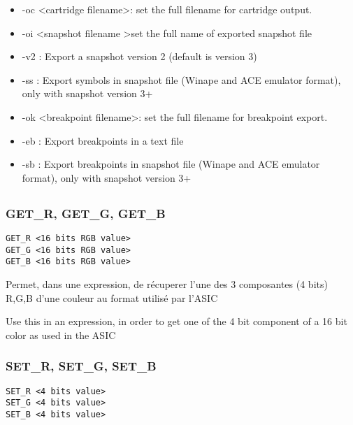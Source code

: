 \begin{xen}
\begin{itemize}
\item -oc \textless cartridge filename\textgreater  : set the full filename for cartridge output.
\item -oi \textless snapshot filename \textgreater set the full name of exported snapshot file
\item -v2 : Export a snapshot version 2 (default is version 3)
\item -ss : Export symbols in snapshot file (Winape and ACE emulator format), only with snapshot version 3+
\item -ok \textless breakpoint filename\textgreater :	set the full filename for breakpoint export.
\item -eb : Export breakpoints in a text file
\item -sb : Export breakpoints in snapshot file (Winape and ACE emulator format), only with snapshot version 3+
\end{itemize}
\end{xen}


\subsection{}

\subsubsection{GET\_R, GET\_G, GET\_B}

\begin{verbatim}
GET_R <16 bits RGB value>
GET_G <16 bits RGB value>
GET_B <16 bits RGB value>
\end{verbatim}

\begin{xfr}
Permet, dans une expression, de récuperer l'une des 3 composantes (4 bits) R,G,B d'une couleur au format utilisé par l'ASIC
\end{xfr}

\begin{xen}
Use this in an expression, in order to get one of the 4 bit component of a 16 bit color as used in the ASIC
\end{xen}

\subsubsection{SET\_R, SET\_G, SET\_B}
\begin{verbatim}
SET_R <4 bits value>
SET_G <4 bits value>
SET_B <4 bits value>
\end{verbatim}

